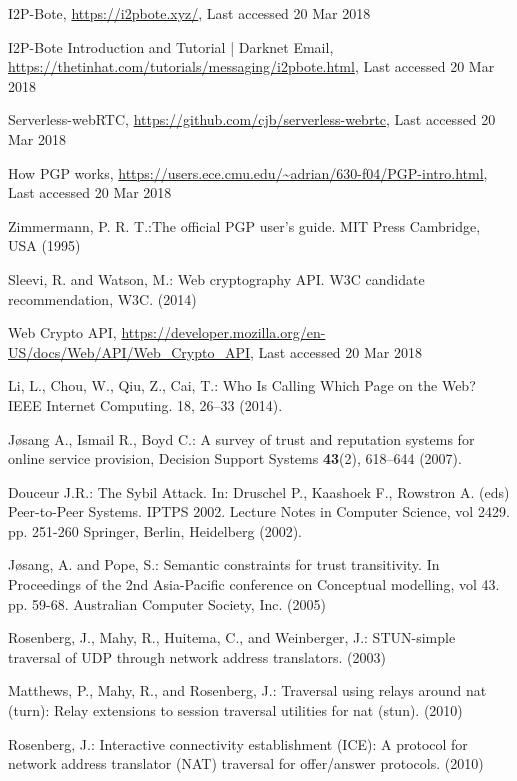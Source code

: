 \documentclass[runningheads]{llncs}
\begin{document}
\begin{thebibliography}{8}
I2P-Bote, \url{https://i2pbote.xyz/}, Last accessed 20 Mar 2018

I2P-Bote Introduction and Tutorial | Darknet Email, \url{https://thetinhat.com/tutorials/messaging/i2pbote.html}, Last accessed 20 Mar 2018

Serverless-webRTC, \url{https://github.com/cjb/serverless-webrtc}, Last accessed 20 Mar 2018

How PGP works, \url{https://users.ece.cmu.edu/~adrian/630-f04/PGP-intro.html}, Last accessed 20 Mar 2018

Zimmermann, P. R. T.:The official PGP user's guide. MIT Press Cambridge,
USA (1995)

Sleevi, R. and Watson, M.: Web cryptography API. W3C candidate recommendation, W3C. (2014)

Web Crypto API, \url{https://developer.mozilla.org/en-US/docs/Web/API/Web\_Crypto\_API}, Last accessed 20 Mar 2018

Li, L., Chou, W., Qiu, Z., Cai, T.: Who Is Calling Which Page on the Web? IEEE Internet Computing. 18, 26–33 (2014).

J\o sang A., Ismail R., Boyd C.: A survey of trust and reputation systems for online service provision, Decision Support Systems  \textbf{43}(2), 618--644 (2007). 

Douceur J.R.: The Sybil Attack. In: Druschel P., Kaashoek F., Rowstron A. (eds) Peer-to-Peer Systems. IPTPS 2002. Lecture Notes in Computer Science, vol 2429. pp. 251-260 Springer, Berlin, Heidelberg  (2002).

J\o sang, A. and Pope, S.: Semantic constraints for trust transitivity. In Proceedings of the 2nd Asia-Pacific conference on Conceptual modelling, vol 43. pp. 59-68. Australian Computer Society, Inc. (2005)

Rosenberg, J., Mahy, R., Huitema, C., and Weinberger, J.: STUN-simple traversal of UDP through network address translators. (2003)

Matthews, P., Mahy, R., and Rosenberg, J.: Traversal using relays around nat (turn): Relay extensions to session traversal utilities for nat (stun). (2010)

Rosenberg, J.: Interactive connectivity establishment (ICE): A protocol for network address translator (NAT) traversal for offer/answer protocols. (2010)


\end{thebibliography}
\end{document}
